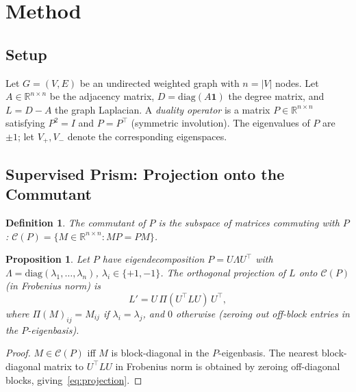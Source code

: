 \documentclass[11pt]{article}
\newtheorem{proposition}[theorem]{Proposition}
\newtheorem{definition}[theorem]{Definition}
\newcommand{\LP}{L'}
\begin{document}
\section{Method}
\label{sec:method}

\subsection{Setup}

Let $G = (V, E)$ be an undirected weighted graph with $n = |V|$ nodes.
Let $A \in \mathbb{R}^{n \times n}$ be the adjacency matrix,
$D = \mathrm{diag}(A\mathbf{1})$ the degree matrix, and $L = D - A$
the graph Laplacian.
A \emph{duality operator} is a matrix $P \in \mathbb{R}^{n \times n}$
satisfying $P^2 = I$ and $P = P^\top$ (symmetric involution).
The eigenvalues of $P$ are $\pm 1$; let $V_+, V_-$ denote the
corresponding eigenspaces.

\subsection{Supervised Prism: Projection onto the Commutant}

\begin{definition}
  The \emph{commutant} of $P$ is the subspace of matrices commuting with
  $P$: $\mathcal{C}(P) = \{M \in \mathbb{R}^{n\times n} : MP = PM\}$.
\end{definition}

\begin{proposition}
  \label{prop:projection}
  Let $P$ have eigendecomposition $P = U \Lambda U^\top$ with
  $\Lambda = \mathrm{diag}(\lambda_1, \ldots, \lambda_n)$,
  $\lambda_i \in \{+1, -1\}$.
  The orthogonal projection of $L$ onto $\mathcal{C}(P)$ (in Frobenius
  norm) is
  \begin{equation}
    \LP = U \, \Pi(U^\top L U) \, U^\top,
    \label{eq:projection}
  \end{equation}
  where $\Pi(M)_{ij} = M_{ij}$ if $\lambda_i = \lambda_j$, and $0$
  otherwise (zeroing out off-block entries in the $P$-eigenbasis).
\end{proposition}

\begin{proof}
  $M \in \mathcal{C}(P)$ iff $M$ is block-diagonal in the $P$-eigenbasis.
  The nearest block-diagonal matrix to $U^\top L U$ in Frobenius norm is
  obtained by zeroing off-diagonal blocks, giving~\eqref{eq:projection}.
\end{proof}
\end{document}
